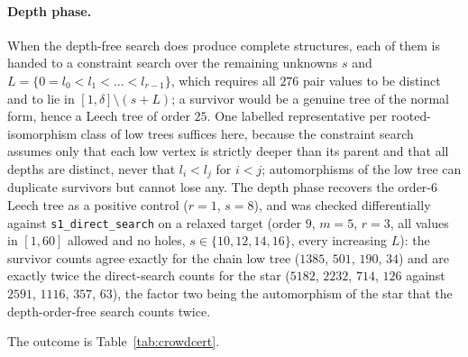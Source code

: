 \documentclass[11pt,a4paper]{article}
\theoremstyle{plain}
\theoremstyle{remark}
\newcommand{\file}[1]{\texttt{#1}}
\begin{document}
\paragraph{Depth phase.}
When the depth-free search does produce complete structures, each of them is
handed to a constraint search over the remaining unknowns $s$ and
$L=\{0=l_0<l_1<\dots<l_{r-1}\}$, which requires all $276$ pair values to be
distinct and to lie in $[1,\delta]\setminus(s+L)$; a survivor would be a genuine
tree of the normal form, hence a Leech tree of order $25$.  One labelled
representative per rooted-isomorphism class of low trees suffices here, because
the constraint search assumes only that each low vertex is strictly deeper than
its parent and that all depths are distinct, never that $l_i<l_j$ for $i<j$;
automorphisms of the low tree can duplicate survivors but cannot lose any.  The
depth phase recovers the order-$6$ Leech tree as a positive control
($r=1$, $s=8$), and was checked differentially against \file{s1\_direct\_search}
on a relaxed target (order $9$, $m=5$, $r=3$, all values in $[1,60]$ allowed and
no holes, $s\in\{10,12,14,16\}$, every increasing $L$): the survivor counts
agree exactly for the chain low tree ($1385$, $501$, $190$, $34$) and are
exactly twice the direct-search counts for the star ($5182$, $2232$, $714$,
$126$ against $2591$, $1116$, $357$, $63$), the factor two being the
automorphism of the star that the depth-order-free search counts twice.

\medskip
The outcome is Table~\ref{tab:crowdcert}.
\end{document}
